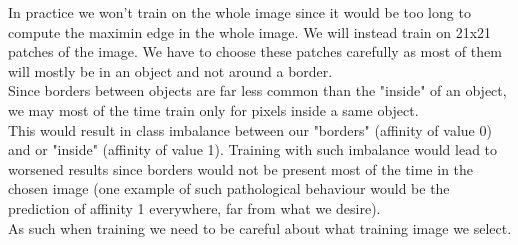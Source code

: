 In practice we won't train on the whole image since it would be too long to
compute the maximin edge in the whole image. We will instead train on 21x21
patches of the image. We have to choose these patches carefully as most of them
will mostly be in an object and not around a border.\\
Since borders between objects are far less common than the "inside" of an
object, we may most of the time train only for pixels inside a same object.\\
This would result in class imbalance between our "borders" (affinity of value
0) and or "inside" (affinity of value 1). Training with such imbalance would
lead to worsened results since borders would not be present most of the time in
the chosen image (one example of such pathological behaviour would be the
prediction of affinity 1 everywhere, far from what we desire).\\

As such when training we need to be careful about what training image we
select.




